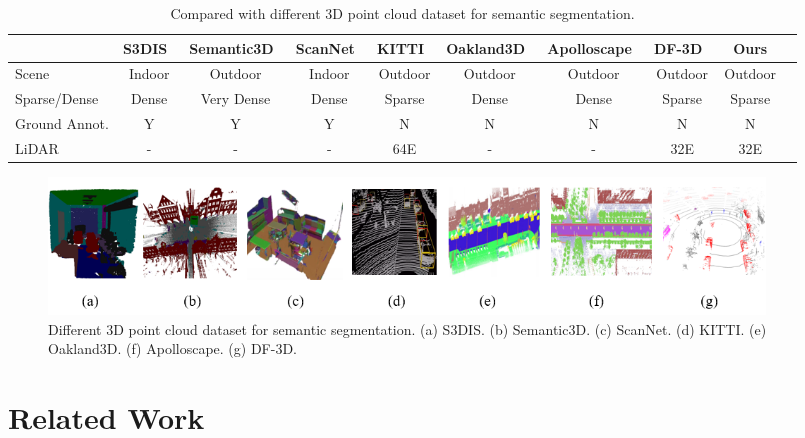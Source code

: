 \documentclass{sip}%
\begin{document}
\begin{table}[!t]
\setlength{\abovecaptionskip}{0cm}
\setlength{\belowcaptionskip}{-20cm}
\caption{Compared with different 3D point cloud dataset for semantic segmentation. }
\label{dataset}
\begin{center}
\setlength{\tabcolsep}{0.8pt}
{\begin{tabular}{lccccccccc}
\hline
 & S3DIS~\cite{armeni20163d} & Semantic3D~\cite{hackel2017semantic3d} & ScanNet~\cite{dai2017scannet} & KITTI~\cite{geiger2012we} &Oakland3D~\cite{Munoz-2009-10227} & Apolloscape~\cite{huang2018apolloscape} & DF-3D~\cite{timmurphy.org}& Ours\\
\hline
Scene & Indoor & Outdoor & Indoor & Outdoor & Outdoor& Outdoor  & Outdoor&Outdoor\\
Sparse/Dense & Dense & Very Dense & Dense & Sparse & Dense & Dense  & Sparse &Sparse  \\
Ground Annot. & Y & Y & Y & N & N & N & N & N  \\
LiDAR & - & - & - & 64E & - & -  & 32E &32E\\
\hline
\end{tabular}}{}
\end{center}
\end{table}

\begin{figure}[hpt]
    \centering
    \includegraphics[width=0.92\textwidth]{diffdata.png}
    \caption{Different 3D point cloud dataset for semantic segmentation. (a) S3DIS. (b) Semantic3D. (c) ScanNet. (d) KITTI. (e) Oakland3D. (f) Apolloscape. (g) DF-3D.}
    \label{fig:diffdata}
\end{figure}




\section{Related Work}
\end{document}
